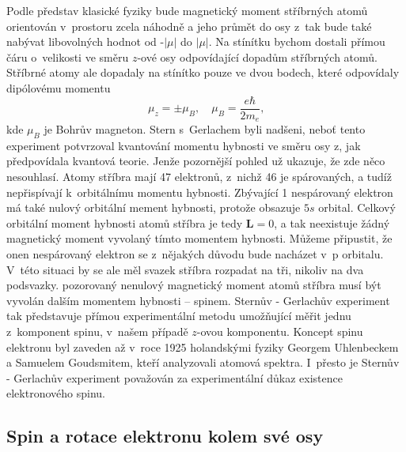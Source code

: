 Podle představ klasické fyziky bude magnetický moment stříbrných atomů orientován v~prostoru zcela náhodně a jeho průmět do osy z~tak bude také nabývat libovolných hodnot od -$|\mu|$ do $|\mu|$. Na stínítku bychom dostali přímou čáru o~velikosti ve směru $z$-ové osy odpovídající dopadům stříbrných atomů. Stříbrné atomy ale dopadaly na stínítko pouze ve dvou bodech, které odpovídaly dipólovému momentu
\begin{equation}
\mu_z = \pm \mu_B, \quad \mu_B = \frac{e\hbar}{2m_e}\mbox{,}
\label{rov:Spin7}
\end{equation}
kde $\mu_B$ je Bohrův magneton. Stern s~Gerlachem byli nadšeni, neboť tento experiment potvrzoval kvantování momentu hybnosti ve směru osy z, jak předpovídala kvantová teorie. Jenže pozornější pohled už ukazuje, že zde něco nesouhlasí.  Atomy stříbra mají 47 elektronů, z~nichž 46 je spárovaných, a tudíž nepřispívají k~orbitálnímu momentu hybnosti. Zbývající 1 nespárovaný elektron má také nulový orbitální mement hybnosti, protože obsazuje $5s$ orbital. Celkový orbitální moment hybnosti atomů stříbra je tedy $\mathbf{L}=0$, a tak neexistuje žádný magnetický moment vyvolaný tímto momentem hybnosti. Můžeme připustit, že onen nespárovaný elektron se z~nějakých důvodu bude nacházet v~p orbitalu. V~této situaci by se ale měl svazek stříbra rozpadat na tři, nikoliv na dva podsvazky. pozorovaný nenulový magnetický moment atomů stříbra musí být vyvolán dalším momentem hybnosti -- spinem. Sternův - Gerlachův experiment tak představuje přímou experimentální metodu umožňující měřit jednu z~komponent spinu, v~našem případě $z$-ovou komponentu. Koncept spinu elektronu byl zaveden až v~roce 1925 holandskými fyziky Georgem Uhlenbeckem a Samuelem Goudsmitem, kteří analyzovali atomová spektra. I~přesto je Sternův - Gerlachův experiment považován za experimentální důkaz existence elektronového spinu.


\subsection{Spin a rotace elektronu kolem své osy}

